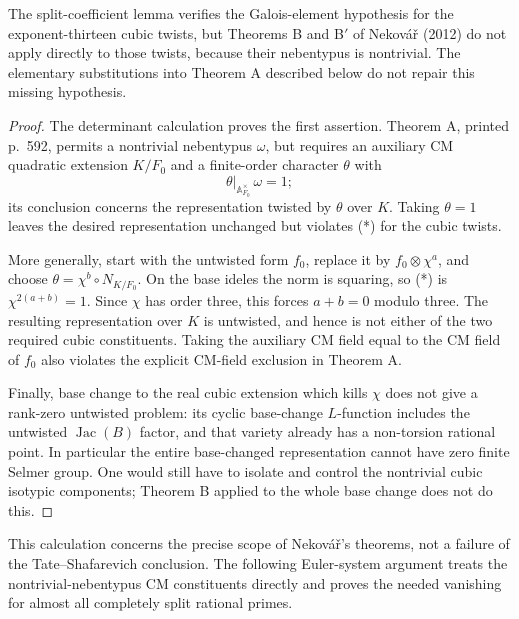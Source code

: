 \begin{proposition}
\label{prop:thirteen-nebentypus-gate}
The split-coefficient lemma verifies the Galois-element
hypothesis for the exponent-thirteen cubic twists, but Theorems
B and B$'$ of Nekov\'a\v r (2012) do not apply directly to those
twists, because their nebentypus is nontrivial.
The elementary substitutions into Theorem A described below
do not repair this missing hypothesis.
\end{proposition}
\begin{proof}
The determinant calculation proves the first assertion.
Theorem A, printed p.~592, permits a nontrivial nebentypus
$\omega$, but requires an auxiliary CM quadratic extension
$K/F_0$ and a finite-order character $\theta$ with
\[
 \theta|_{\mathbb A_{F_0}^{\times}}\,\omega=1;
 \tag{*}
\]
its conclusion concerns the representation twisted by $\theta$
over $K$.  Taking $\theta=1$ leaves the desired representation
unchanged but violates (*) for the cubic twists.

More generally, start with the untwisted form $f_0$, replace it
by $f_0\otimes\chi^a$, and choose
$\theta=\chi^b\circ N_{K/F_0}$.  On the base ideles the norm is
squaring, so (*) is $\chi^{2(a+b)}=1$.  Since $\chi$ has order
three, this forces $a+b=0$ modulo three.  The resulting
representation over $K$ is untwisted, and hence is not either
of the two required cubic constituents.  Taking the auxiliary
CM field equal to the CM field of $f_0$ also violates the
explicit CM-field exclusion in Theorem A.

Finally, base change to the real cubic extension which kills
$\chi$ does not give a rank-zero untwisted problem: its cyclic
base-change $L$-function includes the untwisted
$\operatorname{Jac}(B)$ factor, and that variety already has
a non-torsion rational point.  In particular the entire
base-changed representation cannot have zero finite Selmer
group.  One would still have to isolate and control the
nontrivial cubic isotypic components; Theorem B applied to the
whole base change does not do this.
\end{proof}

This calculation concerns the precise scope of Nekov\'a\v r's
theorems, not a failure of the Tate--Shafarevich conclusion.
The following Euler-system argument treats the nontrivial-nebentypus
CM constituents directly and proves the needed vanishing for almost
all completely split rational primes.
